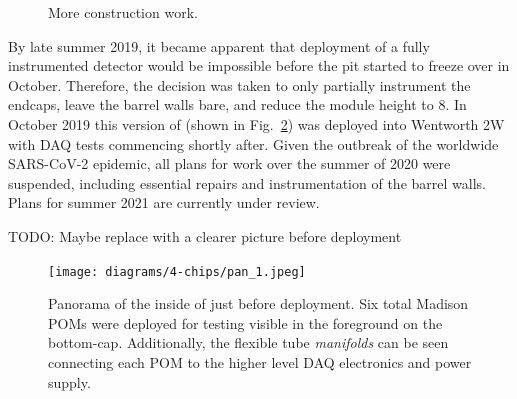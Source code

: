 \begin{figure} %
    \centering
    \quad
    \caption[More \chipsfive construction work]
    {More \chipsfive construction work.}
    \label{fig:work2}
\end{figure}

By late summer 2019, it became apparent that deployment of a fully instrumented detector would be
impossible before the pit started to freeze over in October. Therefore, the decision was taken to
only partially instrument the endcaps, leave the barrel walls bare, and reduce the module height
to \unit{8}{}. In October 2019 this version of \chipsfive (shown in
Fig.~\ref{fig:pan_1}) was deployed into Wentworth 2W with DAQ tests commencing shortly after.
Given the outbreak of the worldwide SARS-CoV-2 epidemic, all plans for work over the summer of
2020 were suspended, including essential repairs and instrumentation of the barrel walls. Plans
for summer 2021 are currently under review.

TODO: Maybe replace with a clearer picture before deployment
\begin{figure} %
    \texttt{[image: diagrams/4-chips/pan\_1.jpeg]}
    \caption[Panorama of the inside of \chipsfive just before deployment]
    {Panorama of the inside of \chipsfive just before deployment. Six total Madison POMs were
        deployed for testing visible in the foreground on the bottom-cap. Additionally, the
        flexible tube \emph{manifolds} can be seen connecting each POM to the higher level DAQ
        electronics and power supply.}
    \label{fig:pan_1}
\end{figure}

